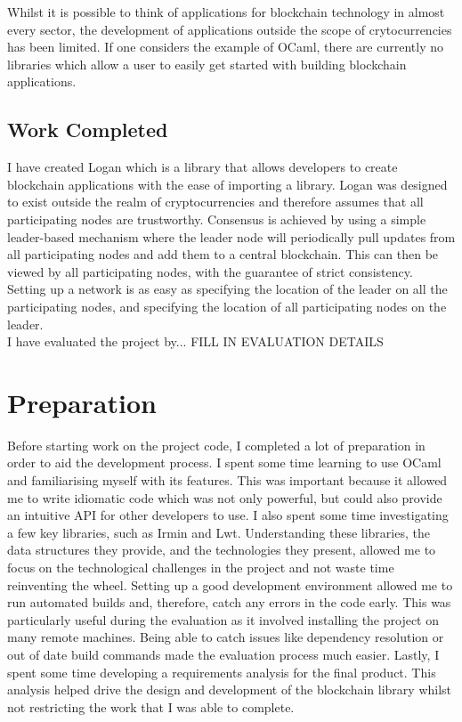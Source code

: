 \documentclass[12pt,a4paper,twoside,openright]{report}
\begin{document}
	Whilst it is possible to think of applications for blockchain technology in almost every sector, the development of applications outside the scope of crytocurrencies has been limited. 
	If one considers the example of OCaml, there are currently no libraries which allow a user to easily get started with building blockchain applications. \\

	\section{Work Completed}
	I have created Logan which is a library that allows developers to create blockchain applications with the ease of importing a library.
	Logan was designed to exist outside the realm of cryptocurrencies and therefore assumes that all participating nodes are trustworthy.
	Consensus is achieved by using a simple leader-based mechanism where the leader node will periodically pull updates from all participating nodes and add them to a central blockchain.
	This can then be viewed by all participating nodes, with the guarantee of strict consistency.
	Setting up a network is as easy as specifying the location of the leader on all the participating nodes, and specifying the location of all participating nodes on the leader.\\
	
	I have evaluated the project by... FILL IN EVALUATION DETAILS

	\chapter{Preparation}
	Before starting work on the project code, I completed a lot of preparation in order to aid the development process.
	I spent some time learning to use OCaml and familiarising myself with its features.
	This was important because it allowed me to write idiomatic code which was not only powerful, but could also provide an intuitive API for other developers to use.
	I also spent some time investigating a few key libraries, such as Irmin and Lwt.
	Understanding these libraries, the data structures they provide, and the technologies they present, allowed me to focus on the technological challenges in the project and not waste time reinventing the wheel. 
	Setting up a good development environment allowed me to run automated builds and, therefore, catch any errors in the code early.
	This was particularly useful during the evaluation as it involved installing the project on many remote machines.
	Being able to catch issues like dependency resolution or out of date build commands made the evaluation process much easier.
	Lastly, I spent some time developing a requirements analysis for the final product. 
	This analysis helped drive the design and development of the blockchain library whilst not restricting the work that I was able to complete.
\end{document}
